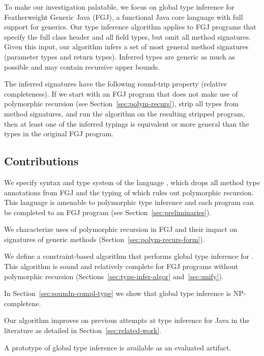 To make our investigation palatable, we focus on global type inference for Featherweight
Generic Java \cite{DBLP:journals/toplas/IgarashiPW01} (FGJ), a
functional Java core language with full support for generics. Our type inference algorithm
applies to FGJ programs that specify the full class header and all field types,
but omit all method signatures. 
Given this input, our algorithm
infers a set of most general method signatures (parameter types and return types).
Inferred types are generic as much as possible and may contain
recursive upper bounds.

The inferred signatures have the following round-trip property
(relative completeness). If we
start with an FGJ program that does not make use of polymorphic
recursion (see Section~\ref{sec:polym-recurs}), strip all types from
method signatures, and run the algorithm on the 
resulting stripped program, then at least one of the inferred typings is equivalent or more
general than the types in the original FGJ program.






\subsection*{Contributions}
\label{sec:contributions}


We specify syntax and type system of the language \FGJGT, which drops all method type
annotations from FGJ and the typing of which rules out polymorphic
recursion. This language is amenable to polymorphic type inference and
each \FGJGT program can be completed to an FGJ program (see Section~\ref{sec:preliminaries}). 

We characterize uses of polymorphic recursion in FGJ and their impact
on signatures of generic methods (Section~\ref{sec:polym-recurs-form}). 

We define a constraint-based algorithm that performs global type
inference for \FGJGT. This algorithm is sound and relatively complete
for FGJ programs without polymorphic recursion
(Sections~\ref{sec:type-infer-algor} and~\ref{sec:unify}). 

In Section~\ref{sec:soundn-compl-type} we show that global type inference is NP-completene.

Our algorithm improves
on previous attempts at type inference for Java in the literature as detailed in
Section~\ref{sec:related-work}. 

A prototype of global type inference is available as an evaluated artifact.

